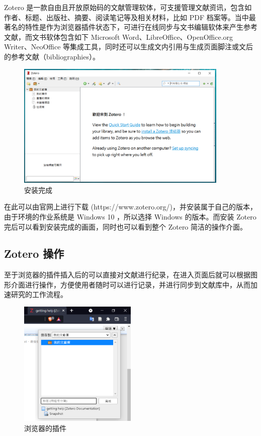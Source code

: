 Zotero 是一款自由且开放原始码的文献管理软体，可支援管理文献资讯，包含如作者、标题、出版社、摘要、阅读笔记等及相关材料，比如 PDF 档案等。当中最著名的特性是作为浏览器插件状态下，可进行在线同步与文书编辑软体来产生参考文献，而文书软体包含如下 Microsoft Word、LibreOffice、OpenOffice.org Writer、NeoOffice 等集成工具，同时还可以生成文内引用与生成页面脚注或文后的参考文献（bibliographies）。

\begin{figure}[htb]
\centering 
\includegraphics[width=0.90\textwidth]{img/c2m1.png} 
\caption{安装完成}
\label{Test}
\end{figure}

在此可以由官网上进行下载 (https://www.zotero.org/)，并安装属于自己的版本，由于环境的作业系统是 Windows 10 ，所以选择 Windows 的版本。而安装 Zotero 完后可以看到安装完成的画面，同时也可以看到整个 Zotero 简洁的操作介面。 

\subsection{Zotero 操作}

至于浏览器的插件插入后的可以直接对文献进行纪录，在进入页面后就可以根据图形介面进行操作，方便使用者随时可以进行记录，并进行同步到文献库中，从而加速研究的工作流程。

\begin{figure}[htb]
\centering 
\includegraphics[width=0.50\textwidth]{img/c2m2.png} 
\caption{浏览器的插件}
\label{Test}
\end{figure}

